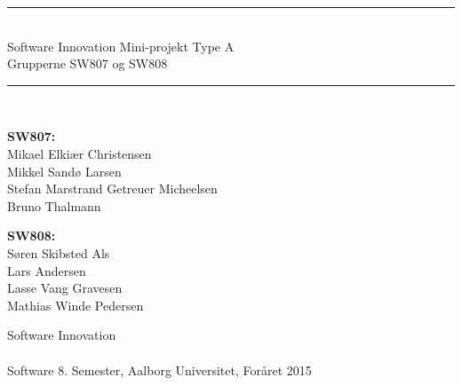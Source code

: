 %
%
%
%
% 



\begin{titlepage}



\begin{center}
\newcommand{\HRule}{\rule{\linewidth}{0.5mm}}
\HRule \\[0.4cm]
\Huge Software Innovation Mini-projekt Type A \\[0.3cm]
	\Large Grupperne SW807 og SW808\\[0.4cm]

\HRule \\[1cm]
\noindent
\begin{minipage}{7cm}
  \textbf{SW807:}\\
  {\small Mikael Elkiær Christensen\\
  Mikkel Sandø Larsen\\
  Stefan Marstrand Getreuer Micheelsen\\
  Bruno Thalmann}
\end{minipage}
 \hfill
\begin{minipage}{5cm}
  \textbf{SW808:}\\
  {\small Søren Skibsted Als\\
  Lars Andersen\\
  Lasse Vang Gravesen\\
  Mathias Winde Pedersen}
\end{minipage}

\vfill
{\Large Software Innovation}
\\ ~\\
{\large Software 8. Semester, Aalborg Universitet, Foråret 2015}

\end{center}
\end{titlepage}

